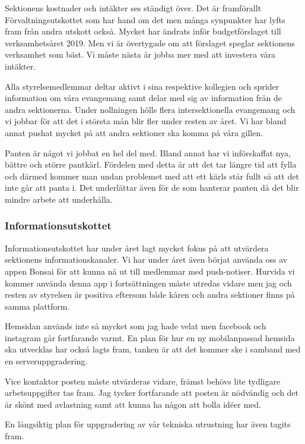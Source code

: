\documentclass[../_main/handlingar.tex]{subfiles}
\begin{document}
Sektionens kostnader och intäkter ses ständigt över. Det är framförallt Förvaltningsutskottet som har hand om det men många synpunkter har lyfts fram från andra utskott också. Mycket har ändrats inför budgetförslaget till verksamhetsåret 2019. Men vi är övertygade om att förslaget speglar sektionens verksamhet som bäst. Vi måste nästa år jobba mer med att investera våra intäkter.

Alla styrelsemedlemmar deltar aktivt i sina respektive kollegien och sprider information om våra evangemang samt delar med sig av information från de andra sektionerna. Under nollningen hölls flera intersektionella evangemang och vi jobbar för att det i största mån blir fler under resten av året. Vi har bland annat pushat mycket på att andra sektioner ska komma på våra gillen.

Panten är något vi jobbat en hel del med. Bland annat har vi införskaffat nya, bättre och större pantkärl. Fördelen med detta är att det tar längre tid att fylla och därmed kommer man undan problemet med att ett kärls står fullt så att det inte går att panta i. Det underlättar även för de som hanterar panten då det blir mindre arbete att underhålla.     

\subsubsection*{Informationsutskottet}

Informationsutskottet har under året lagt mycket fokus på att utvärdera sektionens informationskanaler. Vi har under året även börjat använda oss av appen Bonsai för att kunna nå ut till medlemmar med push-notiser. 
Hurvida vi kommer använda denna app i fortsättningen måste utredas vidare men jag och resten av styrelsen är positiva eftersom både kåren och andra sektioner finns på samma plattform.

Hemsidan används inte så mycket som jag hade velat men facebook och instagram går fortfarande varmt.
En plan för hur en ny mobilanpassad hemsida ska utvecklas har också lagts fram, tanken är att det kommer ske i samband med en serveruppgradering.

Vice kontaktor posten måste utvärderas vidare, främst behövs lite tydligare arbetsuppgifter tas fram. Jag tycker fortfarande att posten är nödvändig och det är skönt med avlastning samt att kunna ha någon att bolla idéer med.

En långsiktig plan för uppgradering av vår tekniska utrustning har även tagits fram. 
\end{document}
